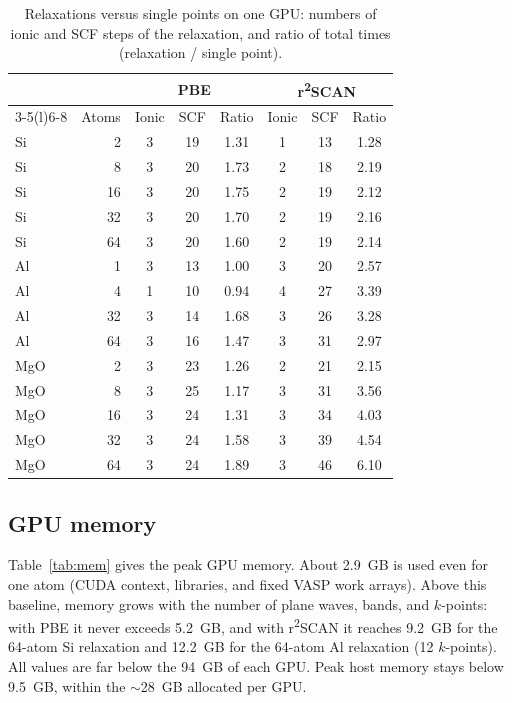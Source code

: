 \documentclass[11pt,letterpaper]{article}
\begin{document}
\begin{table}[htbp]
\centering
\caption{Relaxations versus single points on one GPU: numbers of ionic and SCF steps of the
relaxation, and ratio of total times (relaxation / single point).}
\label{tab:relax}
\small
\begin{tabular}{@{}lr ccc ccc@{}}
\toprule
 & & \multicolumn{3}{c}{PBE} & \multicolumn{3}{c}{r\textsuperscript{2}SCAN} \\
\cmidrule(lr){3-5}\cmidrule(l){6-8}
 & Atoms & Ionic & SCF & Ratio & Ionic & SCF & Ratio \\
\midrule
Si & 2 & 3 & 19 & 1.31 & 1 & 13 & 1.28 \\
Si & 8 & 3 & 20 & 1.73 & 2 & 18 & 2.19 \\
Si & 16 & 3 & 20 & 1.75 & 2 & 19 & 2.12 \\
Si & 32 & 3 & 20 & 1.70 & 2 & 19 & 2.16 \\
Si & 64 & 3 & 20 & 1.60 & 2 & 19 & 2.14 \\
\addlinespace
Al & 1 & 3 & 13 & 1.00 & 3 & 20 & 2.57 \\
Al & 4 & 1 & 10 & 0.94 & 4 & 27 & 3.39 \\
Al & 32 & 3 & 14 & 1.68 & 3 & 26 & 3.28 \\
Al & 64 & 3 & 16 & 1.47 & 3 & 31 & 2.97 \\
\addlinespace
MgO & 2 & 3 & 23 & 1.26 & 2 & 21 & 2.15 \\
MgO & 8 & 3 & 25 & 1.17 & 3 & 31 & 3.56 \\
MgO & 16 & 3 & 24 & 1.31 & 3 & 34 & 4.03 \\
MgO & 32 & 3 & 24 & 1.58 & 3 & 39 & 4.54 \\
MgO & 64 & 3 & 24 & 1.89 & 3 & 46 & 6.10 \\
\bottomrule
\end{tabular}
\end{table}

\subsection{GPU memory}
\label{sec:res-memory}
Table~\ref{tab:mem} gives the peak GPU memory. About \SI{2.9}{GB} is used even for one atom
(CUDA context, libraries, and fixed VASP work arrays). Above this baseline, memory grows with
the number of plane waves, bands, and $k$-points: with PBE it never exceeds \SI{5.2}{GB}, and
with r\textsuperscript{2}SCAN it reaches \SI{9.2}{GB} for the 64-atom Si relaxation and
\SI{12.2}{GB} for the 64-atom Al relaxation (12 $k$-points). All values are far below the
\SI{94}{GB} of each GPU. Peak host memory stays below \SI{9.5}{GB}, within the
$\sim$\SI{28}{GB} allocated per GPU.
\end{document}
